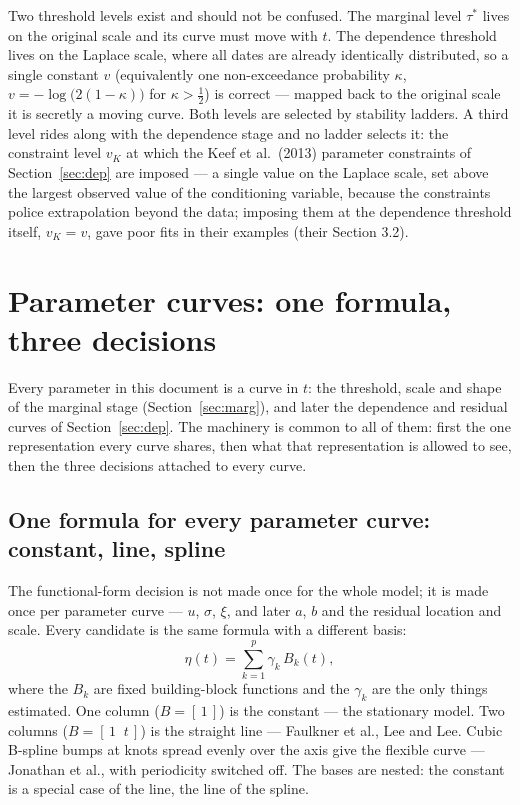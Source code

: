 \documentclass[11pt]{article}
\begin{document}
Two threshold levels exist and should not be confused. The marginal level $\tau^{*}$ lives on the original scale and its curve must move with $t$. The dependence threshold lives on the {\color{green}Laplace} scale, where all dates are already identically distributed, so a single constant $v$ (equivalently one non-exceedance probability $\kappa$, {\color{green}$v = -\log\bigl(2(1 - \kappa)\bigr)$ for $\kappa > \tfrac{1}{2}$}) is correct --- mapped back to the original scale it is secretly a moving curve. Both levels are selected by stability ladders. {\color{green}A third level rides along with the dependence stage and no ladder selects it: the constraint level $v_K$ at which the Keef et al.\ (2013) parameter constraints of Section~\ref{sec:dep} are imposed --- a single value on the Laplace scale, set above the largest observed value of the conditioning variable, because the constraints police extrapolation beyond the data; imposing them at the dependence threshold itself, $v_K = v$, gave poor fits in their examples (their Section 3.2).}

\section{Parameter curves: one formula, three decisions}\label{sec:curves}

Every parameter in this document is a curve in $t$: the threshold, scale and shape of the marginal stage (Section~\ref{sec:marg}), and later the dependence and residual curves of Section~\ref{sec:dep}. The machinery is common to all of them: first the one representation every curve shares, then what that representation is allowed to see, then the three decisions attached to every curve.

\subsection{One formula for every parameter curve: constant, line, spline}\label{sec:basis}

The functional-form decision is not made once for the whole model; it is made once per parameter curve --- $u$, $\sigma$, $\xi$, and later $a$, $b$ and the residual location and scale. Every candidate is the same formula with a different basis:
\begin{equation}\label{eq:basis}
\eta(t) = \sum_{k=1}^{p} \gamma_k\, B_k(t),
\end{equation}
where the $B_k$ are fixed building-block functions and the $\gamma_k$ are the only things estimated. One column ($B = [\,1\,]$) is the constant --- the stationary model. Two columns ($B = [\,1 \;\; t\,]$) is the straight line --- Faulkner et al., Lee and Lee. Cubic B-spline bumps at knots spread evenly over the axis give the flexible curve --- Jonathan et al., with periodicity switched off. The bases are nested: the constant is a special case of the line, the line of the spline.
\end{document}
